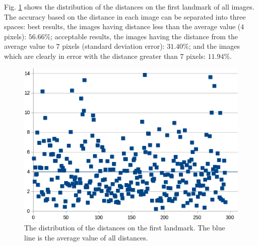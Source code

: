 \documentclass[review]{elsarticle}
\begin{document}
Fig. \ref{figchartlm1} shows the distribution of the distances on the first landmark of all images. The accuracy based on the distance in each image can be
separated into three spaces: best results, the images having distance less
than the average value ($4$ pixels): $56.66\%$; acceptable results, the images having the
distance from the average value to $7$ pixels (standard deviation error): $31.40\%$; and the images which are clearly in error with the distance greater than $7$ pixels: $11.94\%$.

\begin{figure}[htbp]
	\centerline{\includegraphics[scale=0.3]{images/statistic_pronotum_from_scratch_lm1}}
	\caption{The distribution of the distances on the first landmark. The blue line is the average value of all distances.}
	\label{figchartlm1}
\end{figure}
\end{document}
